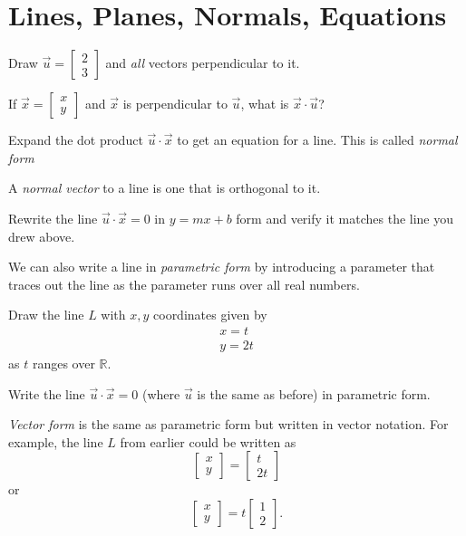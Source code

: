 \documentclass{article}
\newcommand{\R}{\mathbb{R}}
\begin{document}
\section*{Lines, Planes, Normals, Equations}
	\begin{Enum}
		\item Draw $\vec u=\begin{bmatrix}2\\3\end{bmatrix}$ and \emph{all}
		vectors perpendicular to it.
		\item If $\vec x=\begin{bmatrix}x\\y\end{bmatrix}$ and $\vec x$ is 
		perpendicular to $\vec u$, what is $\vec x\cdot \vec u$?
		\item Expand the dot product $\vec u\cdot \vec x$ to get an equation
		for a line.  This is called \emph{normal form}
	\end{Enum}

	A \emph{normal vector} to a line is one that is orthogonal to it.
	\begin{Enum}[resume]
		\item Rewrite the line $\vec u\cdot \vec x = 0$ in $y=mx+b$ form and verify it matches
		the line you drew above.
	\end{Enum}

	We can also write a line in \emph{parametric form} by introducing a parameter
	that traces out the line as the parameter runs over all real numbers.
	\begin{Enum}
		\item Draw the line $L$ with $x,y$ coordinates given by
		\[
			\begin{array}{l}x=t\\y=2t\end{array}
		\]
		as $t$ ranges over $\R$.
		\item Write the line $\vec u \cdot \vec x=0$ (where $\vec u$ is the same as before) in parametric form.
	\end{Enum}
	
	\emph{Vector form} is the same as parametric form but written in vector notation.  For example, the
	line $L$ from earlier could be written as 
	\[
		\begin{bmatrix}x\\y\end{bmatrix}=\begin{bmatrix}t\\2t\end{bmatrix}
	\]
	or
	\[
		\begin{bmatrix}x\\y\end{bmatrix}=t\begin{bmatrix}1\\2\end{bmatrix}.
	\]
\end{document}
